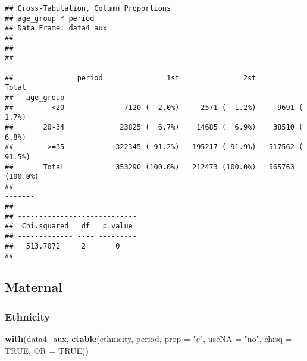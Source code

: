 \documentclass[
]{article}
\newenvironment{Shaded}{\begin{snugshade}}{\end{snugshade}}
\newcommand{\DataTypeTok}[1]{\textcolor[rgb]{0.13,0.29,0.53}{#1}}
\newcommand{\KeywordTok}[1]{\textcolor[rgb]{0.13,0.29,0.53}{\textbf{#1}}}
\newcommand{\NormalTok}[1]{#1}
\newcommand{\OperatorTok}[1]{\textcolor[rgb]{0.81,0.36,0.00}{\textbf{#1}}}
\newcommand{\OtherTok}[1]{\textcolor[rgb]{0.56,0.35,0.01}{#1}}
\newcommand{\StringTok}[1]{\textcolor[rgb]{0.31,0.60,0.02}{#1}}
\begin{document}
\begin{verbatim}
## Cross-Tabulation, Column Proportions  
## age_group * period  
## Data Frame: data4_aux  
## 
## 
## ----------- -------- ----------------- ----------------- -----------------
##               period               1st               2st             Total
##   age_group                                                               
##         <20              7120 (  2.0%)     2571 (  1.2%)     9691 (  1.7%)
##       20-34             23825 (  6.7%)    14685 (  6.9%)    38510 (  6.8%)
##        >=35            322345 ( 91.2%)   195217 ( 91.9%)   517562 ( 91.5%)
##       Total            353290 (100.0%)   212473 (100.0%)   565763 (100.0%)
## ----------- -------- ----------------- ----------------- -----------------
## 
## ----------------------------
##  Chi.squared   df   p.value 
## ------------- ---- ---------
##   513.7072     2       0    
## ----------------------------
\end{verbatim}

\hypertarget{maternal}{%
\subsection{Maternal}\label{maternal}}

\begin{Shaded}
\end{Shaded}

\hypertarget{ethnicity-2}{%
\subsubsection{Ethnicity}\label{ethnicity-2}}

\begin{Shaded}
\begin{Highlighting}[]
\KeywordTok{with}\NormalTok{(data4_aux, }\KeywordTok{ctable}\NormalTok{(ethnicity, period,  }\DataTypeTok{prop =} \StringTok{"c"}\NormalTok{, }\DataTypeTok{useNA =} \StringTok{"no"}\NormalTok{, }\DataTypeTok{chisq =} \OtherTok{TRUE}\NormalTok{, }\DataTypeTok{OR =} \OtherTok{TRUE}\NormalTok{))}
\end{Highlighting}
\end{Shaded}
\end{document}
